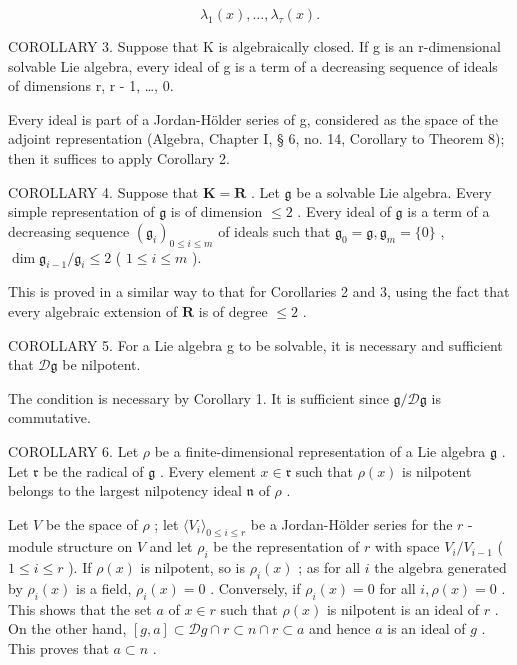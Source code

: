 \[
\lambda_ {1} (x), \dots , \lambda_ {\tau} (x).
\]

COROLLARY 3. Suppose that K is algebraically closed. If g is an r-dimensional solvable Lie algebra, every ideal of g is a term of a decreasing sequence of ideals of dimensions r, r - 1, \ldots, 0.

Every ideal is part of a Jordan-Hölder series of g, considered as the space of the adjoint representation (Algebra, Chapter I, § 6, no. 14, Corollary to Theorem 8); then it suffices to apply Corollary 2.

COROLLARY 4. Suppose that \(\mathbf{K} = \mathbf{R}\) . Let \(\mathfrak{g}\) be a solvable Lie algebra. Every simple representation of \(\mathfrak{g}\) is of dimension \(\leqslant 2\) . Every ideal of \(\mathfrak{g}\) is a term of a decreasing sequence \((\mathfrak{g}_i)_{0\leqslant i\leqslant m}\) of ideals such that \(\mathfrak{g}_0 = \mathfrak{g},\mathfrak{g}_m = \{0\}\) , \(\dim \mathfrak{g}_{i - 1} / \mathfrak{g}_i\leqslant 2\) ( \(1\leqslant i\leqslant m\) ).

This is proved in a similar way to that for Corollaries 2 and 3, using the fact that every algebraic extension of \(\mathbf{R}\) is of degree \(\leqslant 2\) .

COROLLARY 5. For a Lie algebra g to be solvable, it is necessary and sufficient that \(\mathcal{D}\mathfrak{g}\) be nilpotent.

The condition is necessary by Corollary 1. It is sufficient since \(\mathfrak{g} / \mathcal{D}\mathfrak{g}\) is commutative.

COROLLARY 6. Let \(\rho\) be a finite-dimensional representation of a Lie algebra \(\mathfrak{g}\) . Let \(\mathfrak{r}\) be the radical of \(\mathfrak{g}\) . Every element \(x \in \mathfrak{r}\) such that \(\rho(x)\) is nilpotent belongs to the largest nilpotency ideal \(\mathfrak{n}\) of \(\rho\) .

Let \(V\) be the space of \(\rho\) ; let \(\langle V_i \rangle_{0 \leqslant i \leqslant r}\) be a Jordan-Hölder series for the \(r\) -module structure on \(V\) and let \(\rho_i\) be the representation of \(r\) with space \(V_i / V_{i-1}\) ( \(1 \leqslant i \leqslant r\) ). If \(\rho(x)\) is nilpotent, so is \(\rho_i(x)\) ; as for all \(i\) the algebra generated by \(\rho_i(x)\) is a field, \(\rho_i(x) = 0\) . Conversely, if \(\rho_i(x) = 0\) for all \(i, \rho(x) = 0\) . This shows that the set \(a\) of \(x \in r\) such that \(\rho(x)\) is nilpotent is an ideal of \(r\) . On the other hand, \([g, a] \subset \mathcal{D}g \cap r \subset n \cap r \subset a\) and hence \(a\) is an ideal of \(g\) . This proves that \(a \subset n\) .

